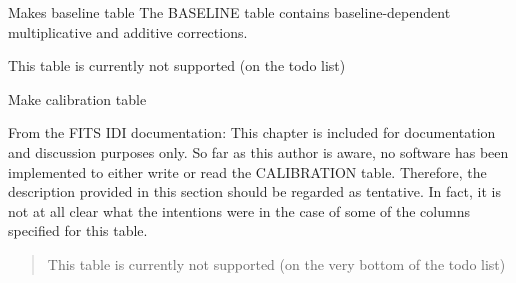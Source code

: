 \documentclass[letterpaper,10pt,english]{sphinxmanual}
\begin{document}

\begin{fulllineitems}
\label{index:pyFitsidi.make_baseline}
Makes baseline table
The BASELINE table contains baseline-dependent multiplicative and additive corrections.

This table is currently not supported (on the todo list)

\end{fulllineitems}



\begin{fulllineitems}
\label{index:pyFitsidi.make_calibration}
Make calibration table

From the FITS IDI documentation:
This chapter is included for documentation and discussion purposes only. So far as this 
author is aware, no software has been implemented to either write or read the CALIBRATION table.
Therefore, the description provided in this section should be regarded as tentative. 
In fact, it is not at all clear what the intentions were in the case of some of the 
columns specified for this table.
\begin{quote}

This table is currently not supported (on the very bottom of the todo list)
\end{quote}

\end{fulllineitems}


\end{document}
